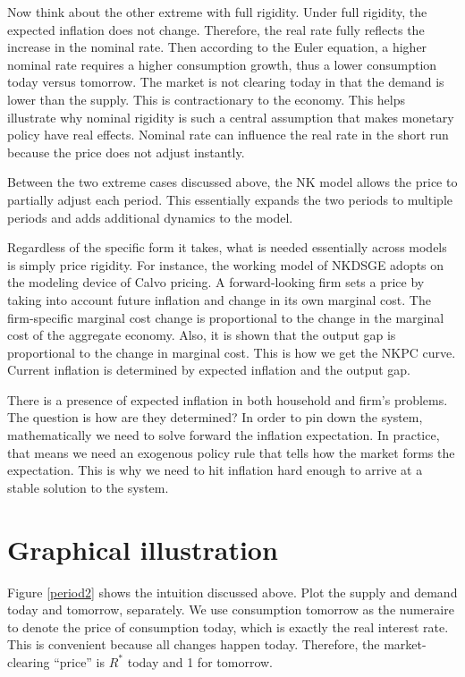 \documentclass[]{article}
\begin{document}
Now think about the other extreme with full rigidity. Under full rigidity, the expected inflation does not change. Therefore, the real rate fully reflects the increase in the nominal rate. Then according to the Euler equation, a higher nominal rate requires a higher consumption growth, thus a lower consumption today versus tomorrow. The market is not clearing today in that the demand is lower than the supply. This is contractionary to the economy. This helps illustrate why nominal rigidity is such a central assumption that makes monetary policy have real effects. Nominal rate can influence the real rate in the short run because the price does not adjust instantly. 

Between the two extreme cases discussed above, the NK model allows the price to partially adjust each period. This essentially expands the two periods to multiple periods and adds additional dynamics to the model. 


Regardless of the specific form it takes, what is needed essentially across models is simply price rigidity. For instance, the working model of NKDSGE adopts on the modeling device of Calvo pricing. A forward-looking firm sets a price by taking into account future inflation and change in its own marginal cost. The firm-specific marginal cost change is proportional to the change in the marginal cost of the aggregate economy. Also, it is shown that the output gap is proportional to the change in marginal cost. This is how we get the NKPC curve. Current inflation is determined by expected inflation and the output gap. 

There is a presence of expected inflation in both household and firm’s problems. The question is how are they determined? In order to pin down the system, mathematically we need to solve forward the inflation expectation. In practice, that means we need an exogenous policy rule that tells how the market forms the expectation. This is why we need to hit inflation hard enough to arrive at a stable solution to the system. 

\section{Graphical illustration}

Figure \ref{period2} shows the intuition discussed above. Plot the supply and demand today and tomorrow, separately. We use consumption tomorrow as the numeraire to denote the price of consumption today, which is exactly the real interest rate. This is convenient because all changes happen today. Therefore, the market-clearing ``price'' is $R^*$ today and 1  for tomorrow. 
\end{document}
